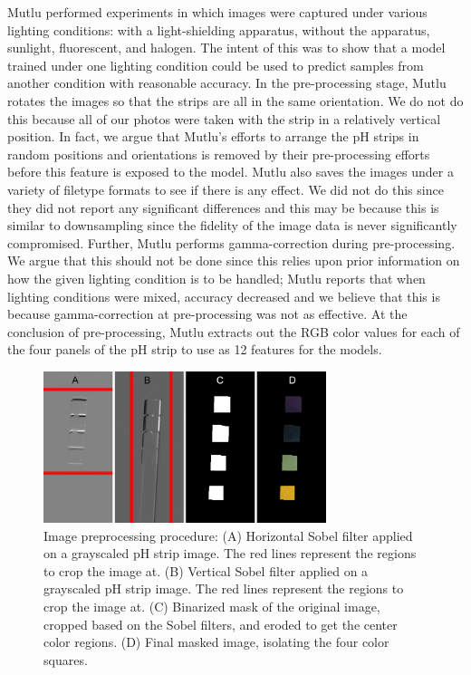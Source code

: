 \documentclass[journal]{IEEEtran}
\begin{document}
Mutlu performed experiments in which images were captured under various lighting conditions: with a light-shielding apparatus, without the apparatus, sunlight, fluorescent, and halogen. The intent of this was to show that a model trained under one lighting condition could be used to predict samples from another condition with reasonable accuracy. In the pre-processing stage, Mutlu rotates the images so that the strips are all in the same orientation. We do not do this because all of our photos were taken with the strip in a relatively vertical position. In fact, we argue that Mutlu’s efforts to arrange the pH strips in random positions and orientations is removed by their pre-processing efforts before this feature is exposed to the model. Mutlu also saves the images under a variety of filetype formats to see if there is any effect. We did not do this since they did not report any significant differences and this may be because this is similar to downsampling since the fidelity of the image data is never significantly compromised. Further, Mutlu performs gamma-correction during pre-processing. We argue that this should not be done since this relies upon prior information on how the given lighting condition is to be handled; Mutlu reports that when lighting conditions were mixed, accuracy decreased and we believe that this is because gamma-correction at pre-processing was not as effective. At the conclusion of pre-processing, Mutlu extracts out the RGB color values for each of the four panels of the pH strip to use as 12 features for the models.

\begin{figure}
\centering
\includegraphics[width=3.25in]{Fig_2.png}
\caption{Image preprocessing procedure: (A) Horizontal Sobel filter applied on a grayscaled pH strip image. The red lines represent the regions to crop the image at. (B) Vertical Sobel filter applied on a grayscaled pH strip image. The red lines represent the regions to crop the image at. (C) Binarized mask of the original image, cropped based on the Sobel filters, and eroded to get the center color regions. (D) Final masked image, isolating the four color squares.}
\label{pre-process}
\end{figure}
\end{document}
